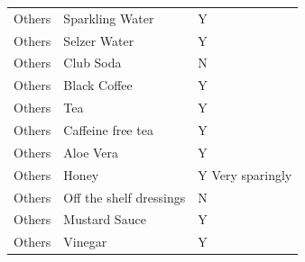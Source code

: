 \documentclass[
  oneside]{book}
\begin{document}
\begin{longtable}[t]{lll}
Others & Sparkling Water & Y\\
Others & Selzer Water & Y\\
Others & Club Soda & N\\
Others & Black Coffee & Y\\
\addlinespace
Others & Tea & Y\\
Others & Caffeine free tea & Y\\
Others & Aloe Vera & Y\\
Others & Honey & Y
Very sparingly\\
Others & Off the shelf dressings & N\\
\addlinespace
Others & Mustard Sauce & Y\\
Others & Vinegar & Y\\*
\end{longtable}
\end{document}
